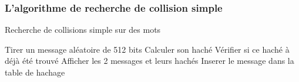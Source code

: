 \documentclass[a4paper,11pt,french]{article}
\begin{document}
\subsubsection{L'algorithme de recherche de collision simple}

\begin{algorithm}
\caption{Recherche de collisions simple sur des mots}
\begin{algorithmic} 
\STATE Tirer un message aléatoire de 512 bits
\STATE Calculer son haché
\STATE Vérifier si ce haché à déjà été trouvé
\STATE Afficher les 2 messages et leurs hachés
\ELSE
\STATE Inserer le message dans la table de hachage
\ENDIF
\ENDWHILE
\end{algorithmic}
\end{algorithm}

\end{document}
